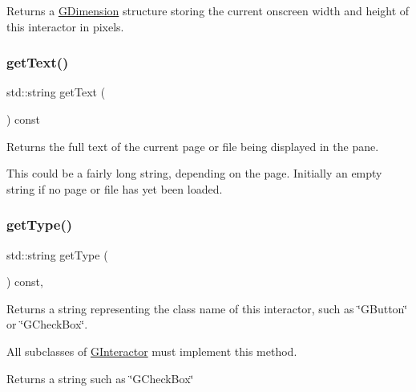 Returns a \mbox{\hyperlink{structGDimension}{G\+Dimension}} structure storing the current onscreen width and height of this interactor in pixels. 

\mbox{\label{classGBrowserPane_aff553c50924b836c29f146ed34a7c6ec}} 
\subsubsection{\texorpdfstring{get\+Text()}{getText()}}
{\footnotesize\ttfamily std\+::string get\+Text (\begin{DoxyParamCaption}{ }\end{DoxyParamCaption}) const\hspace{0.3cm}{\ttfamily [virtual]}}



Returns the full text of the current page or file being displayed in the pane. 

This could be a fairly long string, depending on the page. Initially an empty string if no page or file has yet been loaded. \mbox{\label{classGBrowserPane_a9b72ede4ee8520f987a0c01e30654814}} 
\subsubsection{\texorpdfstring{get\+Type()}{getType()}}
{\footnotesize\ttfamily std\+::string get\+Type (\begin{DoxyParamCaption}{ }\end{DoxyParamCaption}) const\hspace{0.3cm}{\ttfamily [override]}, {\ttfamily [virtual]}}



Returns a string representing the class name of this interactor, such as \char`\"{}\+G\+Button\char`\"{} or \char`\"{}\+G\+Check\+Box\char`\"{}. 

All subclasses of \mbox{\hyperlink{classGInteractor}{G\+Interactor}} must implement this method. \begin{DoxyReturn}{Returns}
a string such as \char`\"{}\+G\+Check\+Box\char`\"{} 
\end{DoxyReturn}


